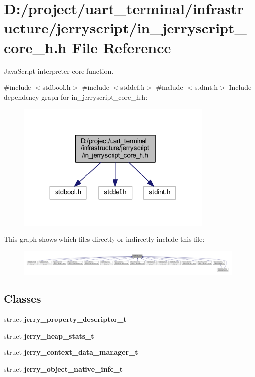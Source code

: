 \section{D\+:/project/uart\+\_\+terminal/infrastructure/jerryscript/in\+\_\+jerryscript\+\_\+core\+\_\+h.h File Reference}
\label{in__jerryscript__core__h_8h}


Java\+Script interpreter core function.  


{\ttfamily \#include $<$stdbool.\+h$>$}\newline
{\ttfamily \#include $<$stddef.\+h$>$}\newline
{\ttfamily \#include $<$stdint.\+h$>$}\newline
Include dependency graph for in\+\_\+jerryscript\+\_\+core\+\_\+h.\+h\+:
\nopagebreak
\begin{figure}[H]
\begin{center}
\leavevmode
\includegraphics[width=273pt]{in__jerryscript__core__h_8h__incl}
\end{center}
\end{figure}
This graph shows which files directly or indirectly include this file\+:
\nopagebreak
\begin{figure}[H]
\begin{center}
\leavevmode
\includegraphics[width=350pt]{in__jerryscript__core__h_8h__dep__incl}
\end{center}
\end{figure}
\subsection*{Classes}
\begin{DoxyCompactItemize}
\item 
struct \textbf{ jerry\+\_\+property\+\_\+descriptor\+\_\+t}
\item 
struct \textbf{ jerry\+\_\+heap\+\_\+stats\+\_\+t}
\item 
struct \textbf{ jerry\+\_\+context\+\_\+data\+\_\+manager\+\_\+t}
\item 
struct \textbf{ jerry\+\_\+object\+\_\+native\+\_\+info\+\_\+t}
\end{DoxyCompactItemize}
